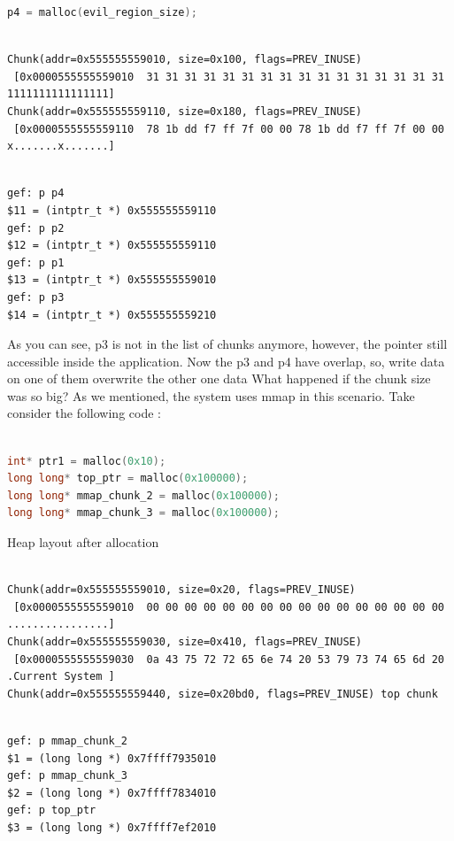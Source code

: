 \documentclass{masterthesis}
\begin{document}
\begin{lstlisting}[language=c,frame=tlrb]
p4 = malloc(evil_region_size);
 \end{lstlisting}

\begin{lstlisting}[frame=tlrb]

Chunk(addr=0x555555559010, size=0x100, flags=PREV_INUSE)
 [0x0000555555559010  31 31 31 31 31 31 31 31 31 31 31 31 31 31 31 31 1111111111111111]
Chunk(addr=0x555555559110, size=0x180, flags=PREV_INUSE)
 [0x0000555555559110  78 1b dd f7 ff 7f 00 00 78 1b dd f7 ff 7f 00 00 x.......x.......]
 \end{lstlisting}

\begin{lstlisting}[frame=tlrb]

gef: p p4
$11 = (intptr_t *) 0x555555559110
gef: p p2
$12 = (intptr_t *) 0x555555559110
gef: p p1
$13 = (intptr_t *) 0x555555559010
gef: p p3
$14 = (intptr_t *) 0x555555559210
 \end{lstlisting}
As you can see, p3 is not in the list of chunks anymore, however, the pointer still accessible inside the application. Now the p3 and p4 have overlap, so, write data on one of them overwrite the other one data
What happened if the chunk size was so big? As we mentioned, the system uses mmap in this scenario. Take consider the following code : 

\begin{lstlisting}[language=c,frame=tlrb]

int* ptr1 = malloc(0x10);
long long* top_ptr = malloc(0x100000);
long long* mmap_chunk_2 = malloc(0x100000);
long long* mmap_chunk_3 = malloc(0x100000);
 \end{lstlisting}
Heap layout after allocation 

\begin{lstlisting}[frame=tlrb]

Chunk(addr=0x555555559010, size=0x20, flags=PREV_INUSE)
 [0x0000555555559010  00 00 00 00 00 00 00 00 00 00 00 00 00 00 00 00 ................]
Chunk(addr=0x555555559030, size=0x410, flags=PREV_INUSE)
 [0x0000555555559030  0a 43 75 72 72 65 6e 74 20 53 79 73 74 65 6d 20 .Current System ]
Chunk(addr=0x555555559440, size=0x20bd0, flags=PREV_INUSE) top chunk
 \end{lstlisting}

\begin{lstlisting}[frame=tlrb]

gef: p mmap_chunk_2
$1 = (long long *) 0x7ffff7935010
gef: p mmap_chunk_3
$2 = (long long *) 0x7ffff7834010
gef: p top_ptr
$3 = (long long *) 0x7ffff7ef2010
 \end{lstlisting}
\end{document}
